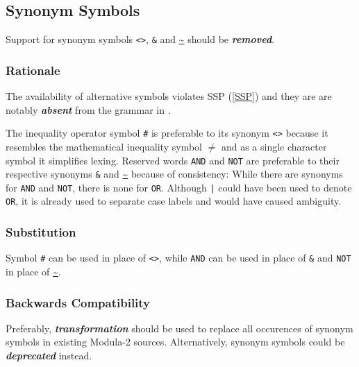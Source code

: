 \documentclass[10pt,a4paper]{article}
\renewcommand{\emph}[1]{\textbf{\textit{#1}}}
\begin{document}
\subsection{Synonym Symbols}

Support for synonym symbols \verb|<>|, \verb|&| and \url{~} should be
\emph{removed}.

\subsubsection{Rationale}

The availability of alternative symbols violates SSP (\ref{SSP}) and they are
are notably \emph{absent} from the grammar in \cite[pp.156-157]{Wirth88}.

The inequality operator symbol \verb|#| is preferable to its synonym \verb|<>|
because it resembles the mathematical inequality symbol \footnotesize
\raisebox{0.35ex} {$\neq$} \normalsize and as a single character symbol it 
simplifies lexing. Reserved words \verb|AND| and \verb|NOT| are preferable to
their respective synonyms \verb|&| and \url{~} because of consistency: While
there are synonyms for \verb|AND| and \verb|NOT|, there is none for \verb|OR|.
Although \verb!|! could have been used to denote \verb|OR|, it is already used
to separate case labels and would have caused ambiguity.

\subsubsection{Substitution}

Symbol \verb|#| can be used in place of \verb|<>|, while \verb|AND| can be used
in place of \verb|&| and \verb|NOT| in place of \url{~}.

\subsubsection{Backwards Compatibility}

Preferably, \emph{transformation} should be used to replace all occurences of
synonym symbols in existing Modula-2 sources. Alternatively, synonym symbols
could be \emph{deprecated} instead.


\end{document}
